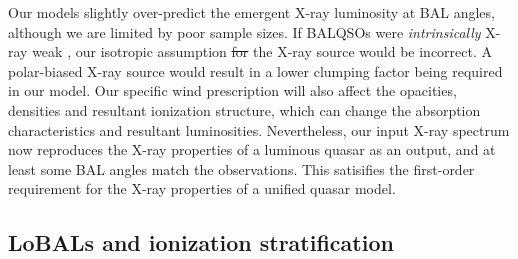 \documentclass[preprint, a4paper, 11pt]{aastex}
\providecommand{\DIFadd}[1]{{\protect\color{blue}\uwave{#1}}} %
\providecommand{\DIFdel}[1]{{\protect\color{red}\sout{#1}}}                      %
\providecommand{\DIFaddbegin}{} %
\providecommand{\DIFaddend}{} %
\providecommand{\DIFdelbegin}{} %
\providecommand{\DIFdelend}{} %
\begin{document}
Our models slightly over-predict the emergent X-ray luminosity at BAL angles, 
although we are limited by poor sample sizes. 
If BALQSOs were {\em intrinsically} 
X-ray weak \citep[as suggested by, e.g.][]{morabito2013},
our isotropic assumption \DIFdelbegin \DIFdel{for }\DIFdelend \DIFaddbegin \DIFadd{foe }\DIFaddend the X-ray source would be incorrect. 
A polar-biased X-ray source would result in a lower clumping factor being
required in our model. Our specific wind
prescription will also affect the opacities, densities and resultant
ionization structure, which can change the absorption characteristics and resultant
luminosities.
Nevertheless, our input X-ray spectrum
now reproduces the X-ray properties of a luminous quasar as an output,
and at least some BAL angles match the observations.
This satisifies the first-order requirement for the X-ray properties of 
a unified quasar model.




\subsection{LoBALs and ionization stratification}
\end{document}

